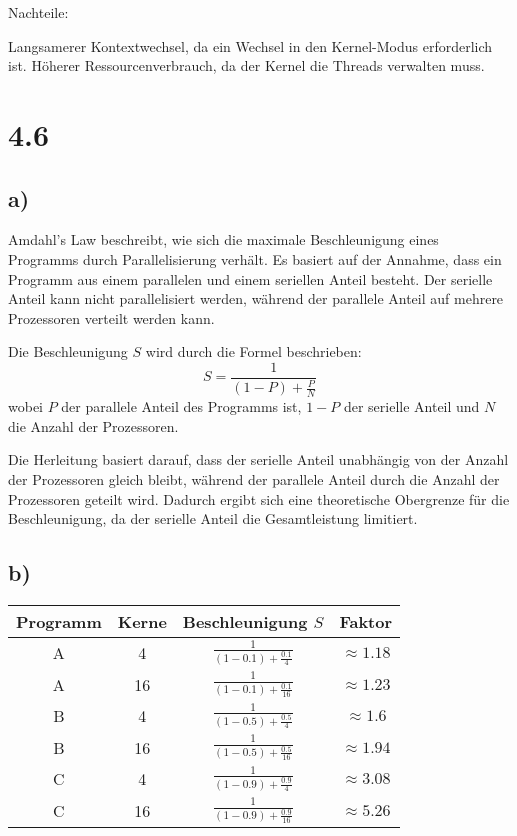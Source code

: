 \documentclass[a4paper,12pt]{article}
\begin{document}
Nachteile:

Langsamerer Kontextwechsel, da ein Wechsel in den Kernel-Modus erforderlich ist.
Höherer Ressourcenverbrauch, da der Kernel die Threads verwalten muss.

\section*{4.6}

\subsection*{a)}

Amdahl's Law beschreibt, wie sich die maximale Beschleunigung eines Programms durch Parallelisierung verhält. Es basiert auf der Annahme, dass ein Programm aus einem parallelen und einem seriellen Anteil besteht. Der serielle Anteil kann nicht parallelisiert werden, während der parallele Anteil auf mehrere Prozessoren verteilt werden kann.

Die Beschleunigung \( S \) wird durch die Formel beschrieben:
\[
S = \frac{1}{(1 - P) + \frac{P}{N}}
\]
wobei \( P \) der parallele Anteil des Programms ist, \( 1-P \) der serielle Anteil und \( N \) die Anzahl der Prozessoren.

Die Herleitung basiert darauf, dass der serielle Anteil unabhängig von der Anzahl der Prozessoren gleich bleibt, während der parallele Anteil durch die Anzahl der Prozessoren geteilt wird. Dadurch ergibt sich eine theoretische Obergrenze für die Beschleunigung, da der serielle Anteil die Gesamtleistung limitiert.

\subsection*{b)}

\begin{table}[H]
    \centering
    \begin{tabular}{|c|c|c|c|}
    \hline
    Programm & Kerne & Beschleunigung \( S \) & Faktor \\ \hline
    A & 4 & \( \frac{1}{(1 - 0.1) + \frac{0.1}{4}} \) & \( \approx 1.18 \) \\ 
    A & 16 & \( \frac{1}{(1 - 0.1) + \frac{0.1}{16}} \) & \( \approx 1.23 \) \\ \hline
    B & 4 & \( \frac{1}{(1 - 0.5) + \frac{0.5}{4}} \) & \( \approx 1.6 \) \\ 
    B & 16 & \( \frac{1}{(1 - 0.5) + \frac{0.5}{16}} \) & \( \approx 1.94 \) \\ \hline
    C & 4 & \( \frac{1}{(1 - 0.9) + \frac{0.9}{4}} \) & \( \approx 3.08 \) \\ 
    C & 16 & \( \frac{1}{(1 - 0.9) + \frac{0.9}{16}} \) & \( \approx 5.26 \) \\ \hline
    \end{tabular}
    
\end{table}
\end{document}
